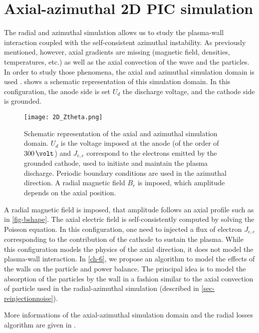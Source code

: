 
\section{Axial-azimuthal \ac{2D} \ac{PIC} simulation}
  \label{sec-axial-azimuthal}
  
  The radial and azimuthal simulation allows us to study the plasma-wall interaction coupled with the self-consistent azimuthal instability.
  As previously mentioned, however, axial gradients are missing (magnetic field, densities, temperatures, etc.) as well as the axial convection of the wave and the particles.
  In order to study those phenomena, the axial and azimuthal simulation domain is used \citep{adam2004,coche2014,lafleur2018,boeuf2018}.
   shows a schematic representation of this simulation domain.
  In this configuration, the anode side is set $U_d$ the discharge voltage, and the cathode side is grounded.
  
  
  
  \begin{figure}[hbt]
    \centering
    \texttt{[image: 2D\_Ztheta.png]}
    \caption{Schematic representation of the axial and azimuthal simulation domain. $U_d$ is the voltage imposed at the anode (of the order of $300\,\volt$) and $J_{e,c}$ correspond to the electrons emitted by the grounded cathode, used to initiate and maintain the plasma discharge. Periodic boundary conditions are used in the azimuthal direction. A radial magnetic field $B_r$ is imposed, which amplitude depends on the axial position. }
    \label{fig-2Dz}
  \end{figure}
  A radial magnetic field is imposed, that amplitude follows an axial profile such as in \cref{fig-bshape}.
  The axial electric field is self-consistently computed by solving the Poisson equation.
  In this configuration, one need to injected a flux of electron $J_{e,c}$ corresponding to the contribution of the cathode to sustain the plasma.
  While this configuration models the physics of the axial direction, it does not model the plasma-wall interaction.
  In \cref{ch-6}, we propose an algorithm to model the effects of the walls on the particle and power balance.
  The principal idea is to model the absorption  of the particles by the wall in a fashion similar to the axial convection of particle used in the radial-azimuthal simulation (described in \cref{sec-reinjectionnoise}).
  
  More informations of the axial-azimuthal simulation domain and the radial losses algorithm are given in .
  
  